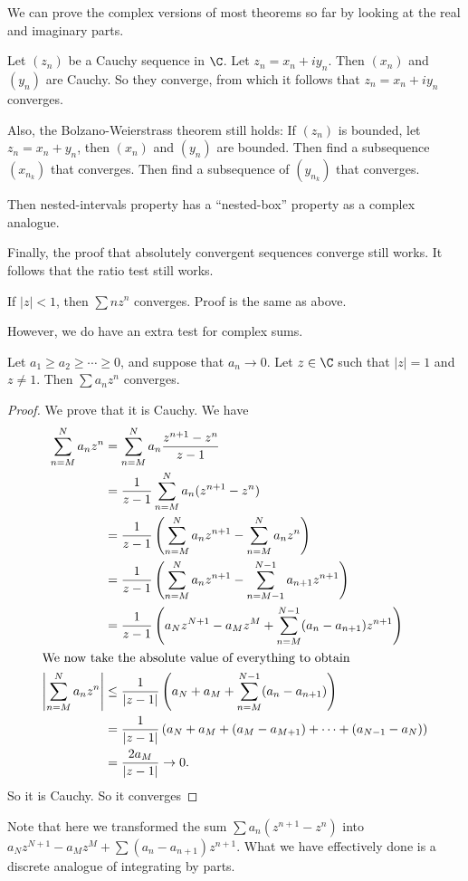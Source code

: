 \documentclass[a4paper]{article}
\begin{document}
We can prove the complex versions of most theorems so far by looking at the real and imaginary parts.

\begin{eg}
  Let $(z_n)$ be a Cauchy sequence in $\C$. Let $z_n = x_n+ iy_n$. Then $(x_n)$ and $(y_n)$ are Cauchy. So they converge, from which it follows that $z_n = x_n + iy_n$ converges.
\end{eg}

Also, the Bolzano-Weierstrass theorem still holds: If $(z_n)$ is bounded, let $z_n = x_n + y_n$, then $(x_n)$ and $(y_n)$ are bounded. Then find a subsequence $(x_{n_k})$ that converges. Then find a subsequence of $(y_{n_k})$ that converges.

Then nested-intervals property has a ``nested-box'' property as a complex analogue.

Finally, the proof that absolutely convergent sequences converge still works. It follows that the ratio test still works.

\begin{eg}
  If $|z| < 1$, then $\sum nz^n$ converges. Proof is the same as above.
\end{eg}

However, we do have an extra test for complex sums.
\begin{lemma}
  Let $a_1 \geq a_2 \geq \cdots \geq 0$, and suppose that $a_n \to 0$. Let $z\in \C$ such that $|z| = 1$ and $z \not= 1$. Then $\sum a_n z^n$ converges.
\end{lemma}

\begin{proof}
  We prove that it is Cauchy. We have
  \begin{align*}
    \sum_{n = M}^N a_n z^n &= \sum_{n = M}^N a_n\frac{z^{n + 1} - z^n}{z - 1}\\
    &= \frac{1}{z - 1}\sum_{n = M}^N a_n (z^{n + 1} - z^n)\\
    &= \frac{1}{z - 1}\left(\sum_{n = M}^N a_n z^{n + 1} - \sum_{n = M}^N a_n z^n\right)\\
    &= \frac{1}{z - 1}\left(\sum_{n = M}^N a_n z^{n + 1} - \sum_{n = M - 1}^{N - 1} a_{n + 1} z^{n + 1}\right)\\
    &= \frac{1}{z - 1}\left(a_N z^{N + 1} - a_M z^M + \sum_{n = M}^{N - 1} (a_n - a_{n + 1})z^{n + 1}\right)\\
    \intertext{We now take the absolute value of everything to obtain}
    \left|\sum_{n = M}^N a_nz^n\right| &\leq \frac{1}{|z - 1|} \left(a_N + a_M + \sum_{n = M}^{N - 1}(a_n - a_{n + 1})\right)\\
    &= \frac{1}{|z - 1|}\left(a_N + a_M + (a_M - a_{M + 1}) + \cdots + (a_{N - 1} - a_{N})\right)\\
    &= \frac{2a_M}{|z - 1|} \to 0.
  \end{align*}
  So it is Cauchy. So it converges
\end{proof}
Note that here we transformed the sum $\sum a_n(z^{n + 1} - z^n)$ into $a_N z^{N + 1} - a_M z^M + \sum (a_n - a_{n + 1})z^{n + 1}$. What we have effectively done is a discrete analogue of integrating by parts.
\end{document}
